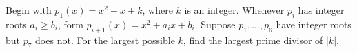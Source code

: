 Begin with $p_1(x)=x^2+x+k$, where $k$ is an integer. Whenever $p_i$ has integer roots $a_i\ge b_i$, form $p_{i+1}(x)=x^2+a_i x+b_i$. Suppose $p_1,\ldots,p_6$ have integer roots but $p_7$ does not. For the largest possible $k$, find the largest prime divisor of $|k|$.
